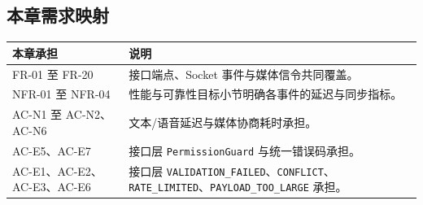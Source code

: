 \subsection{本章需求映射}
\noindent\begin{tabularx}{\textwidth}{L{3cm}Y}
  \toprule
  本章承担 & 说明 \\
  \midrule
  FR-01 至 FR-20 & 接口端点、Socket 事件与媒体信令共同覆盖。 \\
  NFR-01 至 NFR-04 & 性能与可靠性目标小节明确各事件的延迟与同步指标。 \\
  AC-N1 至 AC-N2、AC-N6 & 文本/语音延迟与媒体协商耗时承担。 \\
  AC-E5、AC-E7 & 接口层 \texttt{PermissionGuard} 与统一错误码承担。 \\
  AC-E1、AC-E2、AC-E3、AC-E6 & 接口层 \texttt{VALIDATION\_FAILED}、\texttt{CONFLICT}、\texttt{RATE\_LIMITED}、\texttt{PAYLOAD\_TOO\_LARGE} 承担。 \\
  \bottomrule
\end{tabularx}
